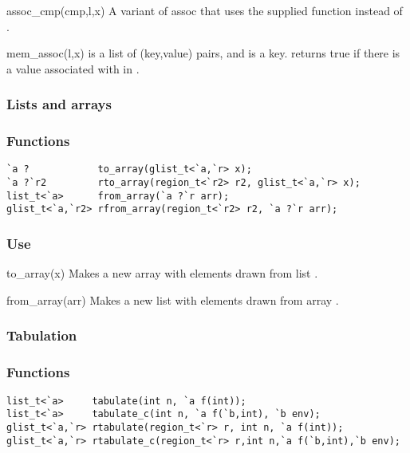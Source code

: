 \begin{defun}{assoc_cmp}{(cmp,l,x)}
A variant of assoc that uses the supplied  function instead
of \code{==}.
\end{defun}

\begin{defun}{mem_assoc}{(l,x)}
 is a list of (key,value) pairs, and  is a key.
 returns true if there is a value associated with
 in .
\end{defun}


\subsubsection*{Lists and arrays}
\subsubsection*{Functions}
\begin{verbatim}
`a ?            to_array(glist_t<`a,`r> x);
`a ?`r2         rto_array(region_t<`r2> r2, glist_t<`a,`r> x);
list_t<`a>      from_array(`a ?`r arr);
glist_t<`a,`r2> rfrom_array(region_t<`r2> r2, `a ?`r arr);
\end{verbatim}

\subsubsection*{Use}

\begin{defun}{to_array}{(x)}
Makes a new array with elements drawn from list .
\end{defun}

\begin{defun}{from_array}{(arr)}
Makes a new list with elements drawn from array .
\end{defun}

\subsubsection*{Tabulation}
\subsubsection*{Functions}
\begin{verbatim}
list_t<`a>     tabulate(int n, `a f(int));
list_t<`a>     tabulate_c(int n, `a f(`b,int), `b env);
glist_t<`a,`r> rtabulate(region_t<`r> r, int n, `a f(int));
glist_t<`a,`r> rtabulate_c(region_t<`r> r,int n,`a f(`b,int),`b env);
\end{verbatim}

